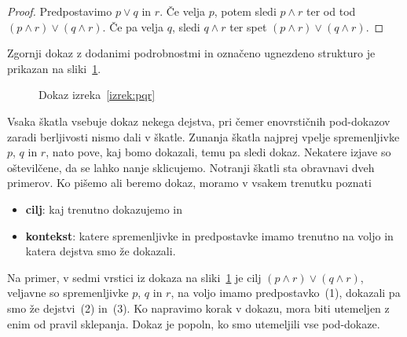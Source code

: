 \begin{proof}
  Predpostavimo $p \lor q$ in $r$. Če velja $p$, potem sledi $p \land r$ ter od tod $(p \land r) \lor (q \land r)$. Če pa velja $q$, sledi $q \land r$ ter spet $(p \land r) \lor (q \land r)$.
\end{proof}

\noindent
Zgornji dokaz z dodanimi podrobnostmi in označeno ugnezdeno strukturo je prikazan na sliki~\ref{fig:izrek-pqr}.
%
\begin{figure}[htp]
  \centering
  \small
  \caption{Dokaz izreka~\ref{izrek:pqr}}
  \label{fig:izrek-pqr}
\end{figure}
%
Vsaka škatla vsebuje dokaz nekega dejstva, pri čemer enovrstičnih pod-dokazov zaradi berljivosti nismo dali v škatle. Zunanja škatla najprej vpelje spremenljivke $p$, $q$ in $r$, nato pove, kaj bomo dokazali,
temu pa sledi dokaz. Nekatere izjave so oštevilčene, da se lahko nanje sklicujemo. Notranji škatli sta obravnavi dveh primerov.
%
Ko pišemo ali beremo dokaz, moramo v vsakem trenutku poznati
%
\begin{itemize}
\item \textbf{cilj}: kaj trenutno dokazujemo in
\item \textbf{kontekst}: katere spremenljivke in predpostavke imamo trenutno na voljo in katera dejstva smo že dokazali.
\end{itemize}
%
Na primer, v sedmi vrstici iz dokaza na sliki~\ref{fig:izrek-pqr} je cilj $(p \land r) \lor (q \land r)$, veljavne so spremenljivke $p$, $q$ in $r$, na voljo imamo predpostavko~(1), dokazali pa smo že dejstvi~(2) in~(3).
%
Ko napravimo korak v dokazu, mora biti utemeljen z enim od pravil sklepanja. Dokaz je
popoln, ko smo utemeljili vse pod-dokaze.

